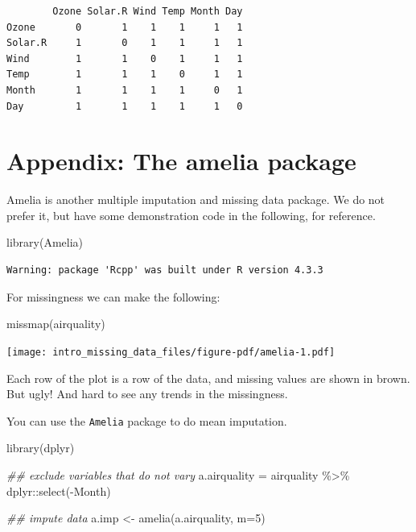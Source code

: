 \documentclass[
  letterpaper,
  DIV=11,
  numbers=noendperiod]{scrreprt}
\newenvironment{Shaded}{}{}
\newcommand{\AttributeTok}[1]{\textcolor[rgb]{0.49,0.56,0.16}{#1}}
\newcommand{\DecValTok}[1]{\textcolor[rgb]{0.25,0.63,0.44}{#1}}
\newcommand{\DocumentationTok}[1]{\textcolor[rgb]{0.73,0.13,0.13}{\textit{#1}}}
\newcommand{\FunctionTok}[1]{\textcolor[rgb]{0.02,0.16,0.49}{#1}}
\newcommand{\NormalTok}[1]{#1}
\newcommand{\OtherTok}[1]{\textcolor[rgb]{0.00,0.44,0.13}{#1}}
\newcommand{\SpecialCharTok}[1]{\textcolor[rgb]{0.25,0.44,0.63}{#1}}
\begin{document}
\begin{verbatim}
        Ozone Solar.R Wind Temp Month Day
Ozone       0       1    1    1     1   1
Solar.R     1       0    1    1     1   1
Wind        1       1    0    1     1   1
Temp        1       1    1    0     1   1
Month       1       1    1    1     0   1
Day         1       1    1    1     1   0
\end{verbatim}

\section{Appendix: The amelia
package}\label{appendix-the-amelia-package}

Amelia is another multiple imputation and missing data package. We do
not prefer it, but have some demonstration code in the following, for
reference.

\begin{Shaded}
\begin{Highlighting}[]
  \FunctionTok{library}\NormalTok{(Amelia)}
\end{Highlighting}
\end{Shaded}

\begin{verbatim}
Warning: package 'Rcpp' was built under R version 4.3.3
\end{verbatim}

For missingness we can make the following:

\begin{Shaded}
\begin{Highlighting}[]
  \FunctionTok{missmap}\NormalTok{(airquality)}
\end{Highlighting}
\end{Shaded}

\begin{center}
\texttt{[image: intro\_missing\_data\_files/figure-pdf/amelia-1.pdf]}
\end{center}

Each row of the plot is a row of the data, and missing values are shown
in brown. But ugly! And hard to see any trends in the missingness.

You can use the \texttt{Amelia} package to do mean imputation.

\begin{Shaded}
\begin{Highlighting}[]
  \FunctionTok{library}\NormalTok{(dplyr)}

\DocumentationTok{\#\# exclude variables that do not vary}
\NormalTok{  a.airquality }\OtherTok{=}\NormalTok{ airquality }\SpecialCharTok{\%\textgreater{}\%}\NormalTok{ dplyr}\SpecialCharTok{::}\FunctionTok{select}\NormalTok{(}\SpecialCharTok{{-}}\NormalTok{Month)}

\DocumentationTok{\#\# impute data}
\NormalTok{  a.imp }\OtherTok{\textless{}{-}} \FunctionTok{amelia}\NormalTok{(a.airquality, }\AttributeTok{m=}\DecValTok{5}\NormalTok{)}
\end{Highlighting}
\end{Shaded}
\end{document}
